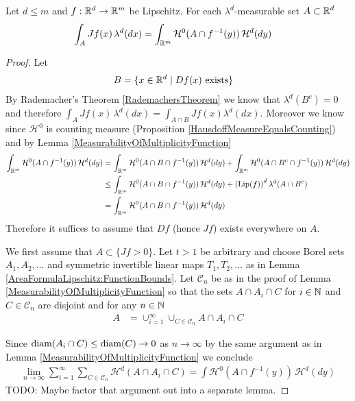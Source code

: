 \begin{thm}\label{AreaFormulaLipschitz}Let $d \leq m$ and $f : \mathbb{R}^d \to \mathbb{R}^m$ be Lipschitz.  For each $\lambda^d$-measurable set $A \subset \mathbb{R}^d$
\begin{align*}
\int_A Jf(x) \, \lambda^d(dx) &= \int_{\mathbb{R}^m} \mathcal{H}^0(A \cap f^{-1}(y)) \, \mathcal{H}^d(dy)
\end{align*}
\end{thm}
\begin{proof}
Let
\begin{align*}
B &= \lbrace x \in \mathbb{R}^d \mid Df(x) \text{ exists} \rbrace
\end{align*}
By Rademacher's Theorem \ref{RademachersTheorem} we know that $\lambda^d(B^c) = 0$ and therefore
$\int_{A} Jf(x) \, \lambda^d(dx) = \int_{A \cap B} Jf(x) \lambda^d(dx)$.  Moreover we know since $\mathcal{H}^0$ is counting measure (Proposition \ref{HausdoffMeasureEqualsCounting})
and by Lemma \ref{MeasurabilityOfMultiplicityFunction}
\begin{align*}
\int_{\mathbb{R}^m} \mathcal{H}^0(A \cap f^{-1}(y)) \, \mathcal{H}^d(dy) 
&= \int_{\mathbb{R}^m} \mathcal{H}^0(A \cap B \cap f^{-1}(y)) \, \mathcal{H}^d(dy) + \int_{\mathbb{R}^m} \mathcal{H}^0(A \cap B^c \cap f^{-1}(y)) \, \mathcal{H}^d(dy) \\
&\leq \int_{\mathbb{R}^m} \mathcal{H}^0(A \cap B \cap f^{-1}(y)) \, \mathcal{H}^d(dy) +\left( \operatorname*{Lip}(f) \right)^d \lambda^d(A \cap B^c) \\
&=\int_{\mathbb{R}^m} \mathcal{H}^0(A \cap B \cap f^{-1}(y)) \, \mathcal{H}^d(dy) 
\end{align*} 
Therefore it suffices to assume that $Df$ (hence $Jf$) exists everywhere on $A$.

We first assume that $A \subset \lbrace Jf > 0 \rbrace$.  Let $t > 1$ be arbitrary and choose Borel sets
$A_1, A_2, \dotsc$ and symmetric invertible linear maps $T_1, T_2, \dotsc$ as in Lemma \ref{AreaFormulaLipschitz:FunctionBounds}.
Let $\mathcal{C}_n$ be as in the proof of Lemma \ref{MeasurabilityOfMultiplicityFunction} so that the sets
$A \cap A_i \cap C$ for $i \in \mathbb{N}$ and $C \in \mathcal{C}_n$ are disjoint and for any $n \in \mathbb{N}$
\begin{align*}
A &= \cup_{i=1}^\infty \cup_{C \in \mathcal{C}_n} A \cap A_i \cap C
\end{align*}

Since $\operatorname*{diam}(A_i \cap C) \leq \operatorname*{diam}(C) \to 0$ as $n \to \infty$ by the same argument as in Lemma \ref{MeasurabilityOfMultiplicityFunction} we conclude
\begin{align}\label{eq:AreaFormula:SumOverCubes}
\lim_{n \to \infty} \sum_{i=1}^\infty \sum_{C \in \mathcal{C}_n} \mathcal{H}^d(A \cap A_i \cap C) = \int \mathcal{H}^0(A \cap f^{-1}(y)) \, \mathcal{H}^d(dy)
\end{align}
TODO: Maybe factor that argument out into a separate lemma.


\end{proof}
